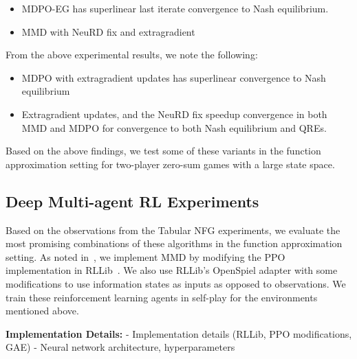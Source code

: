 \begin{itemize}
	\item{MDPO-EG has superlinear last iterate convergence to Nash
	            equilibrium.
	      }
	\item{MMD with NeuRD fix and extragradient }
\end{itemize}

From the above experimental results, we note the following:

\begin{itemize}
	\item {MDPO with extragradient updates has superlinear convergence to Nash equilibrium}
	\item {Extragradient updates, and the NeuRD fix speedup convergence in both MMD and MDPO for convergence 
	to both Nash equilibrium and QREs.}
\end{itemize}

Based on the above findings, we test some of these variants in the function approximation setting for 
two-player zero-sum games with a large state space.

\subsection{Deep Multi-agent RL Experiments}

Based on the observations from the Tabular NFG experiments, we evaluate the most promising
combinations of these algorithms in the function approximation setting.
As noted in~\cite{sokotaUnified2023}, we implement MMD by modifying the PPO
implementation in RLLib~\cite{liangRLlib2018}.
We also use RLLib's OpenSpiel adapter with some modifications to use information states as inputs
as opposed to observations.
We train these reinforcement learning agents in self-play for the environments mentioned above.

\textbf{Implementation Details:} 
- Implementation details (RLLib, PPO modifications, GAE)
- Neural network architecture, hyperparameters

